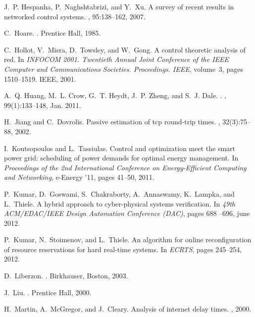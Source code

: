 \documentclass{sig-alternate-ipsn09}
\begin{document}
\begin{thebibliography}{10}
J.~P. Hespanha, P.~Naghshtabrizi, and Y.~Xu.
\newblock A survey of recent results in networked control systems.
, 95:138--162, 2007.

C.~Hoare.
.
\newblock Prentice Hall, 1985.

C.~Hollot, V.~Misra, D.~Towsley, and W.~Gong.
\newblock A control theoretic analysis of red.
\newblock In {\em INFOCOM 2001. Twentieth Annual Joint Conference of the IEEE
  Computer and Communications Societies. Proceedings. IEEE}, volume~3, pages
  1510--1519. IEEE, 2001.

A.~Q. Huang, M.~L. Crow, G.~T. Heydt, J.~P. Zheng, and S.~J. Dale.
.
, 99(1):133--148, Jan. 2011.

H.~Jiang and C.~Dovrolis.
\newblock Passive estimation of tcp round-trip times.
, 32(3):75--88, 2002.

I.~Koutsopoulos and L.~Tassiulas.
\newblock Control and optimization meet the smart power grid: scheduling of
  power demands for optimal energy management.
\newblock In {\em Proceedings of the 2nd International Conference on
  Energy-Efficient Computing and Networking}, e-Energy '11, pages 41--50, 2011.

P.~Kumar, D.~Goswami, S.~Chakraborty, A.~Annaswamy, K.~Lampka, and L.~Thiele.
\newblock A hybrid approach to cyber-physical systems verification.
\newblock In {\em 49th ACM/EDAC/IEEE Design Automation Conference (DAC)}, pages
  688 --696, june 2012.

\newpage

P.~Kumar, N.~Stoimenov, and L.~Thiele.
\newblock An algorithm for online reconfiguration of resource reservations for
  hard real-time systems.
\newblock In {\em ECRTS}, pages 245--254, 2012.

D.~Liberzon.
.
\newblock Birkhauser, Boston, 2003.

J.~Liu.
.
\newblock Prentice Hall, 2000.

H.~Martin, A.~McGregor, and J.~Cleary.
\newblock Analysis of internet delay times.
, 2000.


\end{thebibliography}
\end{document}
